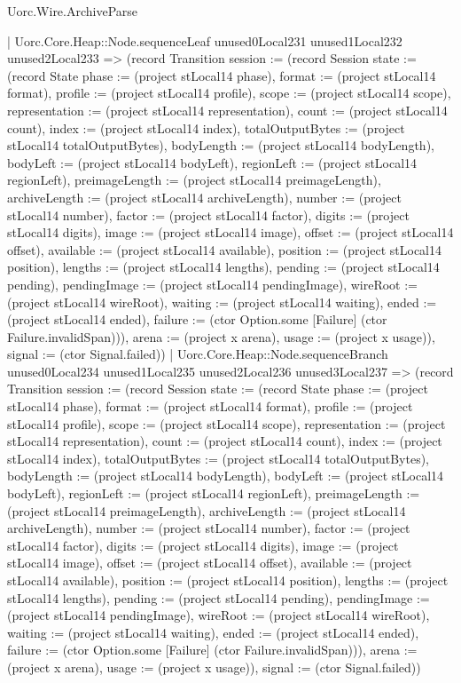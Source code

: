 \begin{lexlean}{Uorc.Wire.ArchiveParse}
\begin{semanticmodule}
{            | Uorc.Core.Heap::Node.sequenceLeaf unused0Local231 unused1Local232 unused2Local233 => (record Transition {session := (record Session {state := (record State {phase := (project stLocal14 phase), format := (project stLocal14 format), profile := (project stLocal14 profile), scope := (project stLocal14 scope), representation := (project stLocal14 representation), count := (project stLocal14 count), index := (project stLocal14 index), totalOutputBytes := (project stLocal14 totalOutputBytes), bodyLength := (project stLocal14 bodyLength), bodyLeft := (project stLocal14 bodyLeft), regionLeft := (project stLocal14 regionLeft), preimageLength := (project stLocal14 preimageLength), archiveLength := (project stLocal14 archiveLength), number := (project stLocal14 number), factor := (project stLocal14 factor), digits := (project stLocal14 digits), image := (project stLocal14 image), offset := (project stLocal14 offset), available := (project stLocal14 available), position := (project stLocal14 position), lengths := (project stLocal14 lengths), pending := (project stLocal14 pending), pendingImage := (project stLocal14 pendingImage), wireRoot := (project stLocal14 wireRoot), waiting := (project stLocal14 waiting), ended := (project stLocal14 ended), failure := (ctor Option.some [Failure] (ctor Failure.invalidSpan))}), arena := (project x arena), usage := (project x usage)}), signal := (ctor Signal.failed)})
            | Uorc.Core.Heap::Node.sequenceBranch unused0Local234 unused1Local235 unused2Local236 unused3Local237 => (record Transition {session := (record Session {state := (record State {phase := (project stLocal14 phase), format := (project stLocal14 format), profile := (project stLocal14 profile), scope := (project stLocal14 scope), representation := (project stLocal14 representation), count := (project stLocal14 count), index := (project stLocal14 index), totalOutputBytes := (project stLocal14 totalOutputBytes), bodyLength := (project stLocal14 bodyLength), bodyLeft := (project stLocal14 bodyLeft), regionLeft := (project stLocal14 regionLeft), preimageLength := (project stLocal14 preimageLength), archiveLength := (project stLocal14 archiveLength), number := (project stLocal14 number), factor := (project stLocal14 factor), digits := (project stLocal14 digits), image := (project stLocal14 image), offset := (project stLocal14 offset), available := (project stLocal14 available), position := (project stLocal14 position), lengths := (project stLocal14 lengths), pending := (project stLocal14 pending), pendingImage := (project stLocal14 pendingImage), wireRoot := (project stLocal14 wireRoot), waiting := (project stLocal14 waiting), ended := (project stLocal14 ended), failure := (ctor Option.some [Failure] (ctor Failure.invalidSpan))}), arena := (project x arena), usage := (project x usage)}), signal := (ctor Signal.failed)})
}
\end{semanticmodule}
\end{lexlean}
